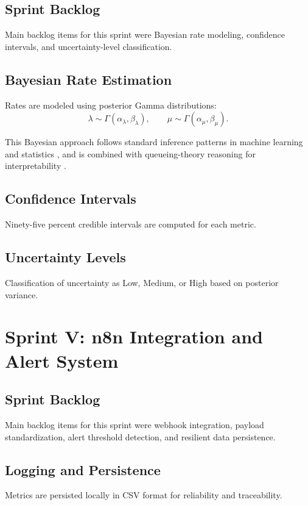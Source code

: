 \subsection{Sprint Backlog}
Main backlog items for this sprint were Bayesian rate modeling, confidence intervals, and uncertainty-level classification.

\subsection{Bayesian Rate Estimation}
Rates are modeled using posterior Gamma distributions:
\begin{equation}
\lambda \sim \Gamma(\alpha_{\lambda}, \beta_{\lambda}),
\qquad
\mu \sim \Gamma(\alpha_{\mu}, \beta_{\mu}).
\end{equation}

This Bayesian approach follows standard inference patterns in machine learning and statistics \cite{bishop_prml},
and is combined with queueing-theory reasoning for interpretability \cite{gross_queueing}.

\subsection{Confidence Intervals}
Ninety-five percent credible intervals are computed for each metric.

\subsection{Uncertainty Levels}
Classification of uncertainty as Low, Medium, or High based on posterior variance.

\section{Sprint V: n8n Integration and Alert System}

\subsection{Sprint Backlog}
Main backlog items for this sprint were webhook integration, payload standardization, alert threshold detection, and resilient data persistence.

\subsection{Logging and Persistence}
Metrics are persisted locally in CSV format for reliability and traceability.

